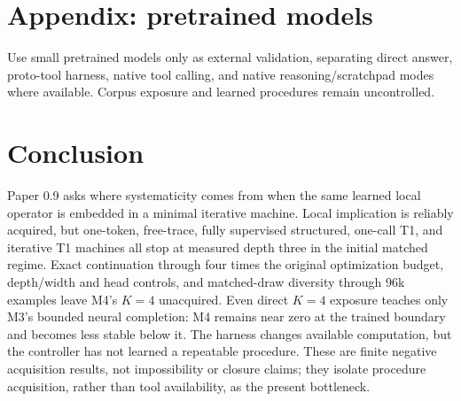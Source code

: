 \documentclass[10pt]{article}
\begin{document}
\section{Appendix: pretrained models}
Use small pretrained models only as external validation, separating direct answer, proto-tool harness, native tool calling, and native reasoning/scratchpad modes where available. Corpus exposure and learned procedures remain uncontrolled.

\section{Conclusion}
Paper 0.9 asks where systematicity comes from when the same learned local operator is embedded in a minimal iterative machine. Local implication is reliably acquired, but one-token, free-trace, fully supervised structured, one-call T1, and iterative T1 machines all stop at measured depth three in the initial matched regime. Exact continuation through four times the original optimization budget, depth/width and head controls, and matched-draw diversity through 96k examples leave M4's $K=4$ unacquired. Even direct $K=4$ exposure teaches only M3's bounded neural completion: M4 remains near zero at the trained boundary and becomes less stable below it. The harness changes available computation, but the controller has not learned a repeatable procedure. These are finite negative acquisition results, not impossibility or closure claims; they isolate procedure acquisition, rather than tool availability, as the present bottleneck.
\end{document}
